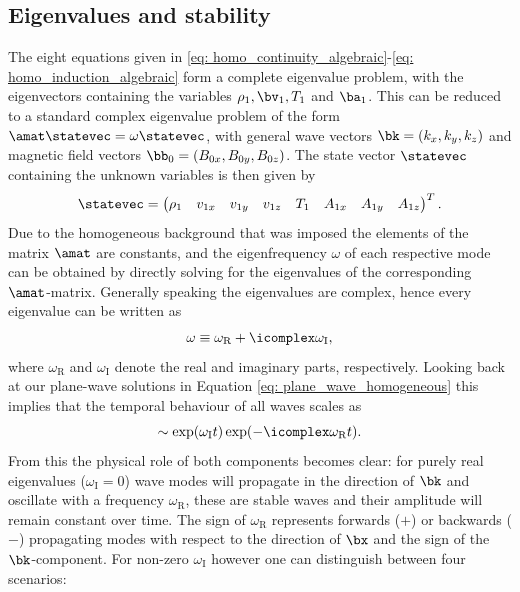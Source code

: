 \subsection{Eigenvalues and stability}
The eight equations given in \eqref{eq: homo_continuity_algebraic}-\eqref{eq: homo_induction_algebraic} form a complete eigenvalue problem, with the eigenvectors containing the variables $\rho_1, \bv_1, T_1$ and $\ba_1$. This can be reduced to a standard complex eigenvalue problem of the form $\amat\statevec = \omega\statevec$, with general wave vectors $\bk = (k_x, k_y, k_z)$ and magnetic field vectors $\bb_0 = (B_{0x}, B_{0y}, B_{0z})$. The state vector $\statevec$ containing the unknown variables is then given by
\begin{equation}
  \statevec = \begin{pmatrix}
    \rho_1 & v_{1x} & v_{1y} & v_{1z} & T_1 & A_{1x} & A_{1y} & A_{1z}
  \end{pmatrix}^T.
\end{equation}
Due to the homogeneous background that was imposed the elements of the matrix $\amat$ are constants, and the eigenfrequency $\omega$ of each respective mode can be obtained by directly solving for the eigenvalues of the corresponding $\amat$-matrix. Generally speaking the eigenvalues are complex, hence every eigenvalue can be written as
\begin{equation}
  \omega \equiv \omega_\text{R} + \icomplex\omega_\text{I},
\end{equation}
where $\omega_\text{R}$ and $\omega_\text{I}$ denote the real and imaginary parts, respectively. Looking back at our plane-wave solutions in Equation \eqref{eq: plane_wave_homogeneous} this implies that the temporal behaviour of all waves scales as
\begin{equation}
  \sim \exp(\omega_\text{I} t)\exp(-\icomplex\omega_\text{R} t).
\end{equation}
From this the physical role of both components becomes clear: for purely real eigenvalues ($\omega_\text{I} = 0$) wave modes will propagate in the direction of $\bk$ and oscillate with a frequency $\omega_\text{R}$, these are stable waves and their amplitude will remain constant over time. The sign of $\omega_\text{R}$ represents forwards ($+$) or backwards ($-$) propagating modes with respect to the direction of $\bx$ and the sign of the $\bk$-component. For non-zero $\omega_\text{I}$ however one can distinguish between four scenarios:
